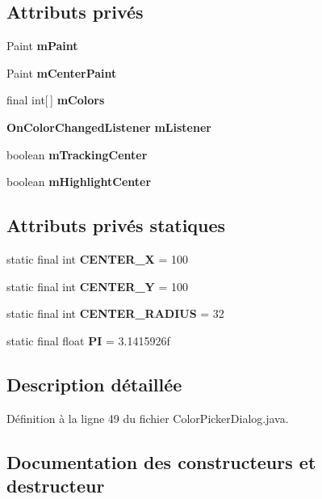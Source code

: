 \subsection*{\-Attributs privés}
\begin{DoxyCompactItemize}
\item 
\-Paint {\bf m\-Paint}
\item 
\-Paint {\bf m\-Center\-Paint}
\item 
final int[$\,$] {\bf m\-Colors}
\item 
{\bf \-On\-Color\-Changed\-Listener} {\bf m\-Listener}
\item 
boolean {\bf m\-Tracking\-Center}
\item 
boolean {\bf m\-Highlight\-Center}
\end{DoxyCompactItemize}
\subsection*{\-Attributs privés statiques}
\begin{DoxyCompactItemize}
\item 
static final int {\bf \-C\-E\-N\-T\-E\-R\-\_\-\-X} = 100
\item 
static final int {\bf \-C\-E\-N\-T\-E\-R\-\_\-\-Y} = 100
\item 
static final int {\bf \-C\-E\-N\-T\-E\-R\-\_\-\-R\-A\-D\-I\-U\-S} = 32
\item 
static final float {\bf \-P\-I} = 3.\-1415926f
\end{DoxyCompactItemize}


\subsection{\-Description détaillée}


\-Définition à la ligne 49 du fichier \-Color\-Picker\-Dialog.\-java.



\subsection{\-Documentation des constructeurs et destructeur}
